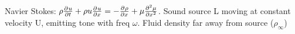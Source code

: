 \begin{comment}

\subsection{Dynamic similitude example}
\textbf{Dimensional analysis example}

variables: F=[$MLT_{-2}$], \mu=[$ML_{-1}T_{-1}$], \rho=[$ML_{-3}$], U=[$LT_{-1}$], D=[L]. n=3, p=5. 

$ \begin{bmatrix}
 & M & L & T \\
\mu & 1 & -1 & -1 \\
\rho & 1 & -3 & 0 \\
U & 0 & 1 & -1 \\
D & 0 & 1 & 0 \\
F & 1 & 1 & -2 
\end{bmatrix}  $ \underrightarrow{\text{R1-R2,R5-R2}}$\begin{bmatrix}

& M & L & T \\
\frac{\mu}{\rho} & 0 & 2 & -1 \\
\rho & 1 & -3 & 0 \\
U & 0 & 1 &-1 \\
D & 0 & 1 & 0 \\
\frac{F}{\rho} & 0 & 4 & -2 
\end{bmatrix}  $ \underrightarrow{\text{delete M col and \rho row}}$\begin{bmatrix}

& L & T \\
\frac{\mu}{\rho} & 2 & -1 \\
U & 1 & -1 \\
D & 1 & 0 \\
\frac{F}{\rho} & 4 & -2 
\end{bmatrix}  $ \underrightarrow{\text{R2-R1,R4-2R1}}

\\

$ \begin{bmatrix}
& L & T \\
\frac{\mu}{\ro} & 2 & -1 \\
\frac{\rho U}{\mu} & -1 & 0 \\
D & 1 & 0 \\
\frac{\rho F}{\mu^{2}} & 0 & 0 
\end{bmatrix}  $ \underrightarrow{\text{eliminate T and \frac{\mu}{\rho}}} $ \begin{bmatrix}
& L \\
\frac{\rho U}{\mu} & -1\\
D & 1\\
\frac{\rho F}{\mu^{2}} & 0 
\end{bmatrix}  $

\end{comment}
Navier Stokes: $\rho\pdv[]{u}{t} + \rho u\pdv[]{u}{x} = -\pdv[]{\rho}{x} + \mu\pdv[2]{\mu}{x}$. Sound source L moving at constant velocity U, emitting tone with freq $ \omega$. Fluid density far away from source ($\rho_{\infty}$)

